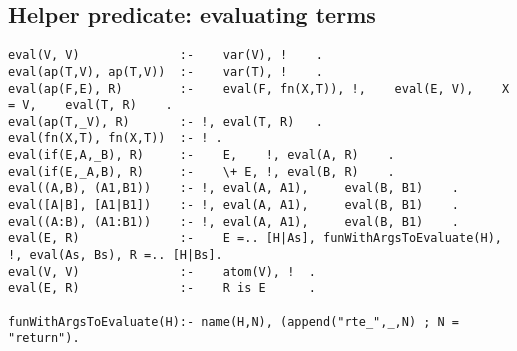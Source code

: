 \subsection{Helper predicate: evaluating terms}

\begin{verbatim}
eval(V, V)              :-    var(V), !    .
eval(ap(T,V), ap(T,V))  :-    var(T), !    .
eval(ap(F,E), R)        :-    eval(F, fn(X,T)), !,    eval(E, V),    X = V,    eval(T, R)    .
eval(ap(T,_V), R)       :- !, eval(T, R)   .
eval(fn(X,T), fn(X,T))  :- ! .
eval(if(E,A,_B), R)     :-    E,    !, eval(A, R)    .
eval(if(E,_A,B), R)     :-    \+ E, !, eval(B, R)    .
eval((A,B), (A1,B1))    :- !, eval(A, A1),     eval(B, B1)    .
eval([A|B], [A1|B1])    :- !, eval(A, A1),     eval(B, B1)    .
eval((A:B), (A1:B1))    :- !, eval(A, A1),     eval(B, B1)    .
eval(E, R)              :-    E =.. [H|As], funWithArgsToEvaluate(H), !, eval(As, Bs), R =.. [H|Bs].
eval(V, V)              :-    atom(V), !  .
eval(E, R)              :-    R is E      .

funWithArgsToEvaluate(H):- name(H,N), (append("rte_",_,N) ; N = "return").
\end{verbatim}
